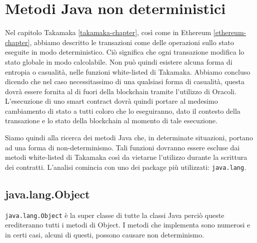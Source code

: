 
\chapter{Metodi Java non deterministici}
\label{metodi-java-non-deterministici}
	Nel capitolo Takamaka \ref{takamaka-chapter}, così come in Ethereum \ref{ethereum-chapter}, abbiamo descritto le transazioni come delle operazioni sullo stato eseguite in modo deterministico. Ciò significa che ogni transazione modifica lo stato globale in modo calcolabile. Non può quindi esistere alcuna forma di entropia o casualità, nelle funzioni white-listed di Takamaka. Abbiamo concluso dicendo che nel caso necessitassimo di una qualsiasi forma di casualità, questa dovrà essere fornita al di fuori della blockchain tramite l'utilizzo di Oracoli. L'esecuzione di uno smart contract dovrà quindi portare al medesimo cambiamento di stato a tutti coloro che lo eseguiranno, dato il contesto della transazione e lo stato della blockchain al momento di tale esecuzione. 

	Siamo quindi alla ricerca dei metodi Java che, in determinate situazioni, portano ad una forma di non-determinismo. Tali funzioni dovranno essere escluse dai metodi white-listed di Takamaka così da vietarne l'utilizzo durante la scrittura dei contratti. L'analisi comincia con uno dei package più utilizzati: \lstinline|java.lang|.

	\section{java.lang.Object}
		\lstinline|java.lang.Object| è la super classe di tutte la classi Java perciò queste erediteranno tutti i metodi di Object. I metodi che implementa sono numerosi e in certi casi, alcuni di questi, possono causare non determinismo.

